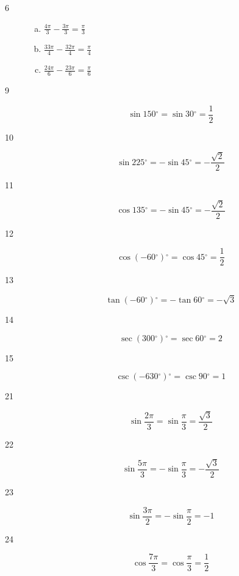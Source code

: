 \documentclass{exam}
\newcommand{\dg}{\ensuremath{^\circ}}
\begin{document}
\begin{description}
      \item[6] 
        \begin{enumerate}[(a)]
          \item $\frac{4 \pi}{3} - \frac{3 \pi}{3} = \boxed{ \frac{\pi}{3} }$
          \item $\frac{33 \pi}{4} - \frac{32 \pi}{4} = \boxed{ \frac{\pi}{4} }$
          \item $\frac{24 \pi}{6} - \frac{23 \pi}{6} = \boxed{ \frac{\pi}{6} }$
        \end{enumerate}

      \item[9]
        \[
          \sin 150 \dg = \sin 30 \dg = \boxed{ \frac{1}{2} }
        \]

      \item[10]
        \[
          \sin 225 \dg = - \sin 45 \dg = \boxed{ - \frac{\sqrt{2}}{2} }
        \]

      \item[11]
        \[
          \cos 135 \dg = - \sin 45 \dg = \boxed{ - \frac{\sqrt{2}}{2} }
        \]

      \item[12]
        \[
          \cos (-60 \dg) \dg = \cos 45 \dg = \boxed{ \frac{1}{2} }
        \]

      \item[13]
        \[
          \tan (-60 \dg) \dg = - \tan 60 \dg = \boxed{ - \sqrt{3} }
        \]

      \item[14]
        \[
          \sec (300 \dg) \dg = \sec 60 \dg = \boxed{ 2 }
        \]

      \item[15]
        \[
          \csc (-630 \dg) \dg = \csc 90 \dg = \boxed{ 1 }
        \]

      \item[21]
        \[
          \sin \frac{2 \pi}{3} = \sin \frac{\pi}{3} = \boxed{ \frac{\sqrt{3}}{2} }
        \]

      \item[22]
        \[
          \sin \frac{5 \pi}{3} = - \sin \frac{\pi}{3} = \boxed{ - \frac{\sqrt{3}}{2} }
        \]

      \item[23]
        \[
          \sin \frac{3 \pi}{2} = - \sin \frac{\pi}{2} = \boxed{ - 1 }
        \]

      \item[24]
        \[
          \cos \frac{7 \pi}{3} = \cos \frac{\pi}{3} = \boxed{ \frac{1}{2} }
        \]


\end{description}
\end{document}

